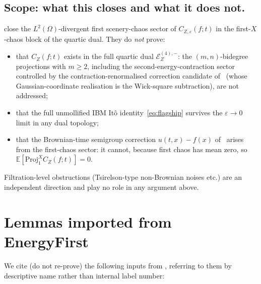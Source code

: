 \documentclass[11pt,reqno]{amsart}
\theoremstyle{plain}
\theoremstyle{definition}
\theoremstyle{remark}
\newcommand{\E}{\mathbb{E}}
\newcommand{\Energy}{\mathcal{E}}
\newcommand{\IBM}{Z}
\begin{document}
\subsection*{Scope: what this closes and what it does not.}\label{sec:scope}
 close the
$L^{2}(\Omega)$-divergent first scenery-chaos sector of
$C_{\IBM,\varepsilon}(f;t)$ in the first-$X$-chaos block of the
quartic dual. They do \emph{not} prove:
\begin{itemize}
\item that $C_{\IBM}(f;t)$ exists in the full quartic dual
$\Energy_{\IBM}^{(4),-}$: the $(m,n)$-bidegree projections with
$m\ge 2$, including the second-energy-contraction sector
controlled by the contraction-renormalised correction candidate
of~\cite{Fontes-EnergyFirst} (whose Gaussian-coordinate realisation
is the Wick-square subtraction), are not addressed;
\item that the full unmollified IBM It\^o
identity~\eqref{eq:flagship} survives the $\varepsilon\to 0$ limit
in any dual topology;
\item that the Brownian-time semigroup correction
$u(t,x)-f(x)$ of~\cite{Fontes-EnergyFirst} arises from the
first-chaos sector: it cannot, because first chaos has mean zero, so
$\E[\mathrm{Proj}_{1}^{X}C_{\IBM}(f;t)]=0$.
\end{itemize}

Filtration-level obstructions (Tsirelson-type non-Brownian noises
etc.) are an independent direction and play no role in any argument
above.

\section{Lemmas imported from EnergyFirst}\label{sec:imports}

We cite (do not re-prove) the following inputs from
\cite{Fontes-EnergyFirst}, referring to them by descriptive name
rather than internal label number:
\end{document}
